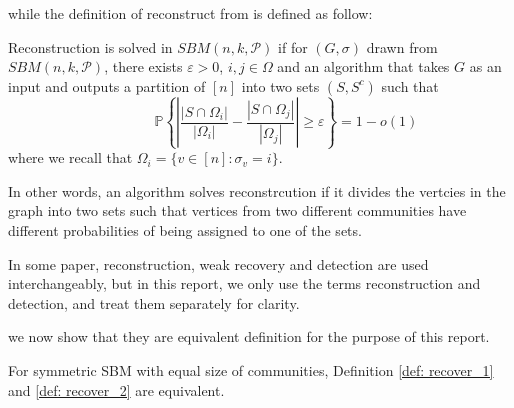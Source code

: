 while the definition of reconstruct from \cite{TheConjecture} is defined as follow:
\begin{definition}[Reconstruction]\label{def: recover_2}
Reconstruction is solved in $SBM(n,k,\mathcal{P})$ if for $(G,\sigma)$ drawn from $SBM(n,k,\mathcal{P})$, there exists $\varepsilon > 0$, $i,j \in\Omega$ and an algorithm that takes $G$ as an input and outputs a partition of $[n]$ into two sets $(S,S^c)$ such that\begin{equation}\label{equn:1.3}
    ~~~~~~~~~~~~~~~~~\mathbb{P}\left\{ \left| \frac{|S \cap \Omega_i|}{|\Omega_i|} - \frac{|S \cap \Omega_j|}{|\Omega_j|} \right| \geq \varepsilon \right\} = 1 - o(1)
\end{equation}
where we recall that $\Omega_i = \{ v\in [n] : \sigma_v = i \}.$
\end{definition}
\begin{remark}
    In other words, an algorithm solves reconstrcution if it divides the vertcies in the graph into two sets such that vertices from two different communities have different probabilities of being assigned to one of the sets.
\end{remark}
\begin{remark}
    In some paper, reconstruction, weak recovery and detection are used interchangeably, but in this report, we only use the terms reconstruction and detection, and treat them separately for clarity.
\end{remark}
we now show that they are equivalent definition for the purpose of this report.
\begin{claim}\label{claim1}
    For symmetric SBM with equal size of communities, Definition \ref{def: recover_1} and \ref{def: recover_2} are equivalent.
\end{claim}
